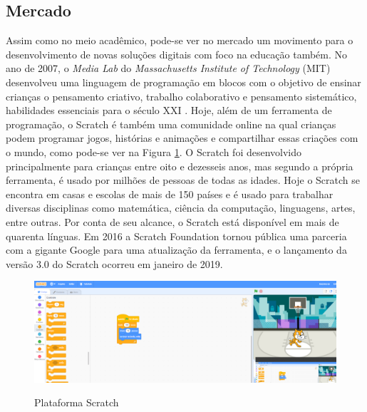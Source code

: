 \subsection{Mercado}
Assim como no meio acadêmico, pode-se ver no mercado um movimento para o desenvolvimento de novas soluções digitais com foco na educação também. 
No ano de 2007, o \textit{Media Lab} do \textit{Massachusetts Institute of Technology} (MIT) desenvolveu uma linguagem de programação em blocos com o objetivo de ensinar crianças o pensamento criativo, trabalho colaborativo e pensamento sistemático, habilidades essenciais para o século XXI \cite{about_scratch}. Hoje, além de um ferramenta de programação, o Scratch é também uma comunidade online na qual crianças podem programar jogos, histórias e animações e compartilhar essas criações com o mundo, como pode-se ver na Figura \ref{figura:scratch}. O Scratch foi desenvolvido principalmente para crianças entre oito e dezesseis anos, mas segundo a própria ferramenta, é usado por milhões de pessoas de todas as idades. Hoje o Scratch se encontra em casas e escolas de mais de 150 países e é usado para trabalhar diversas disciplinas como matemática, ciência da computação, linguagens, artes, entre outras. Por conta de seu alcance, o Scratch está disponível em mais de quarenta línguas. Em 2016 a Scratch Foundation tornou pública uma parceria com a gigante Google para uma atualização da ferramenta, e o lançamento da versão 3.0 do Scratch ocorreu em janeiro de 2019.

\begin{figure}[H]
    \caption{Plataforma Scratch}
    \centering
        \includegraphics[width=\linewidth]{Imagens/cap2/scratch.png}
    \label{figura:scratch}
\end{figure}

